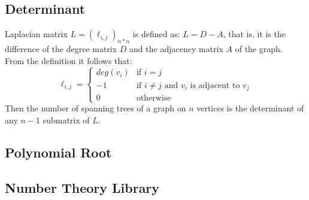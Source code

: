 ﻿\documentclass[10pt]{article}
\begin{document}
\subsection{Determinant}

Laplacian matrix $L=(\ell_{i,j})_{n*n}$ is defined as: $L=D-A$, that is, it is the difference of the degree matrix $D$ and the adjacency matrix $A$ of the graph. \\
From the definition it follows that:
\begin{displaymath}
\ell_{i,j}=
\left\{ \begin{array}{ll}
deg(v_i) & \textrm{if } i=j \\
-1 & \textrm{if }i\ne j\textrm{ and }v_i\textrm{ is adjacent to }v_j \\
0 & \textrm{otherwise}
\end{array} \right.
\end{displaymath}
Then the number of spanning trees of a graph on $n$ vertices is the determinant of any $n-1$ submatrix of $L$.
\subsection{Polynomial Root}

\subsection{Number Theory Library}

\end{document}
